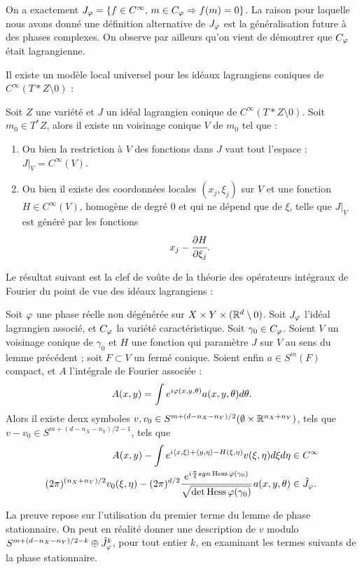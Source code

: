 On a exactement $J_{\varphi}=\{f \in C^{\infty},\, m \in C_{\varphi}\Rightarrow f(m)=0\}$. La raison pour laquelle nous avons donné une définition alternative de $J_{\varphi}$ est la généralisation future à des phases complexes. On observe par ailleurs qu'on vient de démontrer que $C_{\varphi}$ était lagrangienne.

Il existe un modèle local universel pour les idéaux lagrangiens coniques de $C^{\infty}(T*Z \setminus 0)$ :
\begin{lem}
	Soit $Z$ une variété et $J$ un idéal lagrangien conique de $C^{\infty}(T*Z \setminus 0)$. Soit $m_0\in T^*Z$, alors il existe un voisinage conique $V$ de $m_0$ tel que :
	\begin{enumerate}
		\item Ou bien la restriction à $V$ des fonctions dans $J$ vaut tout l'espace : $J|_V = C^{\infty}(V)$.
		\item Ou bien il existe des coordonnées locales $(x_j,\xi_j)$ sur $V$ et une fonction $H\in C^{\infty}(V)$, homogène de degré 0 et qui ne dépend que de $\xi$, telle que $J|_{V}$ est généré par les fonctions
		\begin{equation*}
			x_j-\cfrac{\partial H}{\partial \xi_j}.
		\end{equation*}
	\end{enumerate} 
\end{lem}

Le résultat suivant est la clef de voûte de la théorie des opérateurs intégraux de Fourier du point de vue des idéaux lagrangiens :

\begin{theorem}[Hormander]
	Soit $\varphi$ une phase réelle non dégénérée sur $X \times Y \times (\mathbb{R}^d \setminus 0)$. Soit $J_\varphi$ l'idéal lagrangien associé, et $C_{\varphi}$ la variété caractéristique. Soit $\gamma_0\in C_{\varphi}$. Soient $V$ un voisinage conique de $\gamma_0$ et $H$ une fonction qui paramètre $J$ sur $V$ au sens du lemme précédent ; soit $F \subset V$ un fermé conique. Soient enfin $a \in S^m(F)$ compact, et $A$ l'intégrale de Fourier associée :
	\begin{equation*}
		A(x,y)=\int e^{i\varphi(x,y,\theta)}a(x,y,\theta)d\theta.
	\end{equation*}
	Alors il existe deux symboles $v,v_0 \in S^{m + (d-n_X-n_Y)/2}(\emptyset \times \mathbb{R}^{n_X+n_Y})$, tels que $v-v_0 \in S^{m + (d-n_X-n_Y)/2-1}$, tels que 
	\begin{align*}
		A(x,y)-\int e^{i\langle x,\xi\rangle+\langle y,\eta\rangle - H(\xi,\eta)}v(\xi,\eta)d\xi d\eta &\in C^{\infty}\\
		(2\pi)^{(n_X+n_Y)/2}v_0(\xi,\eta)-(2\pi)^{d/2}\cfrac{e^{i \frac{\pi}{4}sgn\operatorname{Hess} \varphi(\gamma_0)} }{\sqrt{\det\operatorname{Hess} \varphi (\gamma_0)}}\:a(x,y,\theta) &\in \hat{J}_{\varphi}.
	\end{align*}
\end{theorem}
La preuve repose sur l'utilisation du premier terme du lemme de phase stationnaire. On peut en réalité donner une description de $v$ modulo $S^{m + (d-n_X-n_Y)/2-k}\oplus \hat{J}_{\varphi}^k$, pour tout entier $k$, en examinant les termes suivants de la phase stationnaire.

